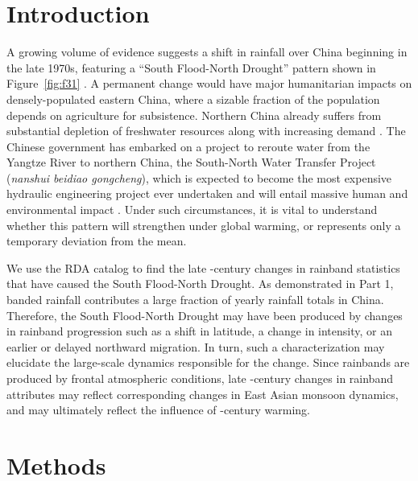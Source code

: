 \documentclass{ametsoc}
\begin{document}

\section{Introduction}

	A growing volume of evidence suggests a shift in rainfall over China beginning in the late 1970s, featuring a ``South Flood-North Drought'' pattern shown in Figure~\ref{fig:f31} \citep{Hu1997,Gong2002,Nigam2013}.  A permanent change would have major humanitarian impacts on densely-populated eastern China, where a sizable fraction of the population depends on agriculture for subsistence. Northern China already suffers from substantial depletion of freshwater resources along with increasing demand \citep{Currell2012,Gleeson2012}. The Chinese government has embarked on a project to reroute water from the Yangtze River to northern China, the South-North Water Transfer Project (\textit{nanshui beidiao gongcheng}), which is expected to become the most expensive hydraulic engineering project ever undertaken and will entail massive human and environmental impact \citep{Magee2011}. Under such circumstances, it is vital to understand whether this pattern will strengthen under global warming, or represents only a temporary deviation from the mean. 
	
	We use the RDA catalog to find the late -century changes in rainband statistics that have caused the South Flood-North Drought. As demonstrated in Part 1, banded rainfall contributes a large fraction of yearly rainfall totals in China. Therefore, the South Flood-North Drought may have been produced by changes in rainband progression such as a shift in latitude, a change in intensity, or an earlier or delayed northward migration. In turn, such a characterization may elucidate the large-scale dynamics responsible for the change. Since rainbands are produced by frontal atmospheric conditions, late -century changes in rainband attributes may reflect corresponding changes in East Asian monsoon dynamics, and may ultimately reflect the influence of -century warming. 

\section{Methods}
\end{document}
